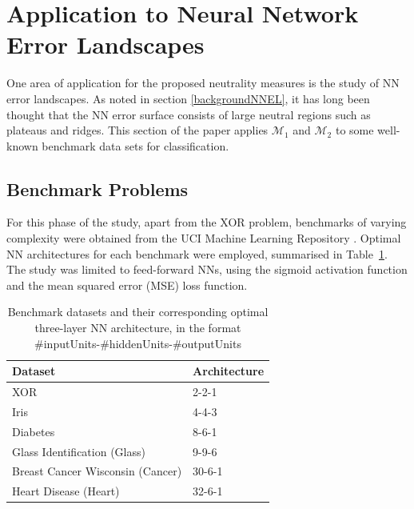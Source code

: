 \documentclass[conference]{IEEEtran}
\begin{document}
%		

\section{Application to Neural Network Error Landscapes}
\label{nnELApplication}
One area of application for the proposed neutrality measures is the study of NN error landscapes. As noted in section \ref{backgroundNNEL}, it has long been thought that the NN error surface consists of large neutral regions such as plateaus and ridges. This section of the paper applies ${\mathcal{M}_1}$ and ${\mathcal{M}_2}$ to some well-known benchmark data sets for classification.

\subsection{Benchmark Problems}
\label{nnBenchmarks}
For this phase of the study, apart from the XOR problem, benchmarks of varying complexity were obtained from the UCI Machine Learning Repository \cite{Lichman2013}. Optimal NN architectures for each benchmark were employed, summarised in Table~\ref{tblNNBenchmarks}. The study was limited to feed-forward NNs, using the sigmoid activation function and the mean squared error (MSE) loss function.

\begin{table}[!t] 
	\renewcommand{\arraystretch}{1.3}
	\caption{Benchmark datasets and their corresponding optimal three-layer NN architecture, in the format \#inputUnits-\#hiddenUnits-\#outputUnits}
	\label{tblNNBenchmarks}
	\centering
	\begin{tabular}{|l|l|}
		\hline
		\textbf{Dataset}		& \textbf{Architecture} \\ \hline				
		XOR									&  2-2-1		\\
		Iris								&  4-4-3 \cite{gupta1998weight}		\\
		Diabetes							&  8-6-1 \cite{carvalho2006particle}			\\
		Glass Identification (Glass)		&  9-9-6 \cite{gupta1998weight}			\\
		Breast Cancer Wisconsin (Cancer)	&  30-6-1 \cite{carvalho2006particle}		\\
		Heart Disease (Heart)				&  32-6-1 \cite{carvalho2006particle}	\\ \hline		
	\end{tabular}
\end{table}
\end{document}
